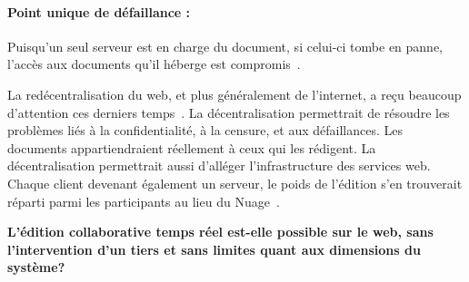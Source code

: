 \paragraph{Point unique de défaillance :} Puisqu'un seul serveur est en charge
du document, si celui-ci tombe en panne, l'accès aux documents qu'il héberge est
compromis~\cite{demers1987epidemic}.

La redécentralisation du web, et plus généralement de l'internet, a reçu
beaucoup d'attention ces derniers temps~\cite{benet2014ipfs, maelstrom,
  mansour2016demonstration, wood2014ethereum}. La décentralisation permettrait
de résoudre les problèmes liés à la confidentialité, à la censure, et aux
défaillances. Les documents appartiendraient réellement à ceux qui les
rédigent. La décentralisation permettrait aussi d'alléger l'infrastructure des
services web. Chaque client devenant également un serveur, le poids de l'édition
s'en trouverait réparti parmi les participants au lieu du
Nuage~\cite{mell2011national}.


\textbf{L'édition collaborative temps réel est-elle possible sur le web, sans
  l'intervention d'un tiers et sans limites quant aux dimensions du système?}


